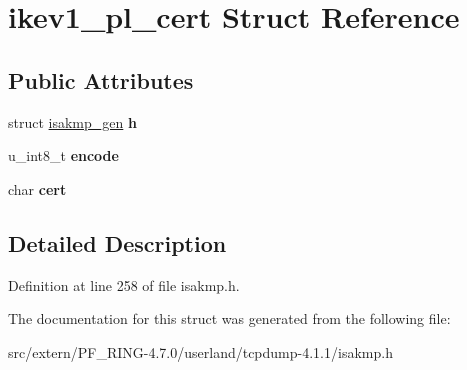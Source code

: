 \hypertarget{structikev1__pl__cert}{
\section{ikev1\_\-pl\_\-cert Struct Reference}
\label{structikev1__pl__cert}
}
\subsection*{Public Attributes}
\begin{DoxyCompactItemize}
\item 
\hypertarget{structikev1__pl__cert_ab74d0757cb781c50edc0609c250f2685}{
struct \hyperlink{structisakmp__gen}{isakmp\_\-gen} {\bfseries h}}
\label{structikev1__pl__cert_ab74d0757cb781c50edc0609c250f2685}

\item 
\hypertarget{structikev1__pl__cert_a89f1c2ef7690008cd71aeb2ab8c60392}{
u\_\-int8\_\-t {\bfseries encode}}
\label{structikev1__pl__cert_a89f1c2ef7690008cd71aeb2ab8c60392}

\item 
\hypertarget{structikev1__pl__cert_a8dbd4baaa44ffaf6e7a8bab7d0e087c9}{
char {\bfseries cert}}
\label{structikev1__pl__cert_a8dbd4baaa44ffaf6e7a8bab7d0e087c9}

\end{DoxyCompactItemize}


\subsection{Detailed Description}


Definition at line 258 of file isakmp.h.



The documentation for this struct was generated from the following file:\begin{DoxyCompactItemize}
\item 
src/extern/PF\_\-RING-\/4.7.0/userland/tcpdump-\/4.1.1/isakmp.h\end{DoxyCompactItemize}
